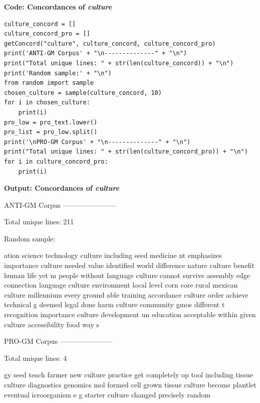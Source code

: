 \textbf{Code: Concordances of \textit{culture}}

\begin{lstlisting}
culture_concord = []
culture_concord_pro = []
getConcord("culture", culture_concord, culture_concord_pro)
print('ANTI-GM Corpus' + "\n--------------" + "\n")             
print("Total unique lines: " + str(len(culture_concord)) + "\n")
print('Random sample:' + "\n") 
from random import sample
chosen_culture = sample(culture_concord, 10)
for i in chosen_culture:
    print(i)
pro_low = pro_text.lower()
pro_list = pro_low.split()
print('\nPRO-GM Corpus' + "\n--------------" + "\n")            
print("Total unique lines: " + str(len(culture_concord_pro)) + "\n")
for i in culture_concord_pro:
    print(i)
\end{lstlisting}

\textbf{Output: Concordances of \textit{culture}}

\begin{footnotesize}

ANTI-GM Corpus\newline
-----------------------

Total unique lines: 211

Random sample:

ation science technology culture including seed medicine\newline 
nt emphasizes importance culture needed value identified\newline
 world difference nature culture benefit human life yet m\newline
 people without language culture cannot survive assembly\newline 
edge connection language culture environment local level\newline 
 corn core rural mexican culture millennium every ground\newline 
able training accordance culture order achieve technical\newline 
g deemed legal done harm culture community gmos different\newline
t recognition importance culture development un education\newline
 acceptable within given culture accessibility food way s

PRO-GM Corpus\newline
-----------------------

Total unique lines: 4

gy seed teach farmer new culture practice get completely\newline
op tool including tissue culture diagnostics genomics mol\newline
formed cell grown tissue culture become plantlet eventual\newline
icroorganism e g starter culture changed precisely random
\end{footnotesize}


